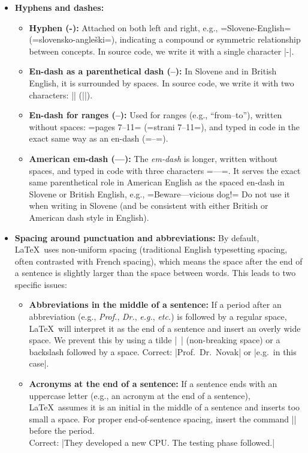 \documentclass[9pt]{style/friteza}
\begin{document}
\begin{itemize}
    \item \textbf{Hyphens and dashes:} 
    \begin{itemize}
        \item \textbf{Hyphen (-):} Attached on both left and right, e.g., \ltx=Slovene-English= (\ltx=slovensko-angleški=), indicating a compound or symmetric relationship between concepts. In source code, we write it with a single character \ltx|-|.
        \item \textbf{En-dash as a parenthetical dash (--):} In Slovene and in British English, it is surrounded by spaces. In source code, we write it with two characters: \ltx|| (\ltx||).
        \item \textbf{En-dash for ranges (--):} Used for ranges (e.g., \enquote{from--to}), written without spaces: \ltx=pages 7--11= (\ltx=strani 7--11=), and typed in code in the exact same way as an en-dash (\ltx=--=).
        \item \textbf{American em-dash (---):} The \textit{em-dash} is longer, written without spaces, and typed in code with three characters \ltx=---=. It serves the exact same parenthetical role in American English as the spaced en-dash in Slovene or British English, e.g., \ltx=Beware---vicious dog!= Do not use it when writing in Slovene (and be consistent with either British or American dash style in English).
    \end{itemize}

    \item \textbf{Spacing around punctuation and abbreviations:} By default, \LaTeX\ uses non-uniform spacing (traditional English typesetting spacing, often contrasted with French spacing), which means the space after the end of a sentence is slightly larger than the space between words. This leads to two specific issues:
    \begin{itemize}
        \item \textbf{Abbreviations in the middle of a sentence:} If a period after an abbreviation (e.g., \textit{Prof.}, \textit{Dr.}, \textit{e.g.}, \textit{etc.}) is followed by a regular space, \LaTeX\ will interpret it as the end of a sentence and insert an overly wide space. We prevent this by using a tilde \ltx|~| (non-breaking space) or a backslash followed by a space. Correct: \ltx|Prof.~Dr.~Novak| or \ltx|e.g.\ in this case|.
        \item \textbf{Acronyms at the end of a sentence:} If a sentence ends with an uppercase letter (e.g., an acronym at the end of a sentence), \LaTeX\ assumes it is an initial in the middle of a sentence and inserts too small a space. For proper end-of-sentence spacing, insert the command \ltx|\@| before the period. \\Correct: \ltx|They developed a new CPU\@. The testing phase followed.|
    \end{itemize}
    

\end{itemize}
\end{document}
